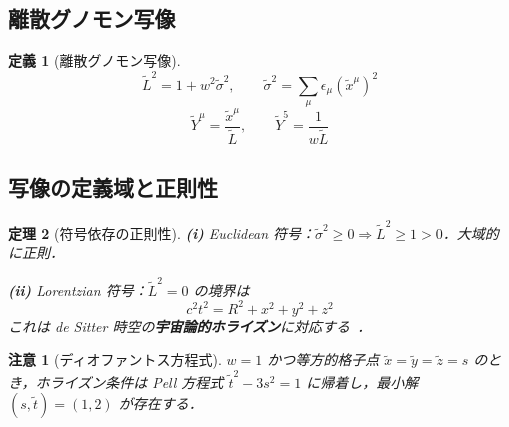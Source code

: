 \documentclass[12pt,a4paper]{ltjsarticle}
\newtheorem{theorem}{定理}[section]
\newtheorem{definition}[theorem]{定義}
\newtheorem*{remark}{注意}
\begin{document}
\subsection{離散グノモン写像}

\begin{definition}[離散グノモン写像]\label{def:discrete}
\begin{equation}
\tilde{L}^2 = 1 + w^2 \tilde{\sigma}^2, \qquad \tilde{\sigma}^2 = \sum_\mu \epsilon_\mu (\tilde{x}^\mu)^2 \tag{6.2}
\end{equation}
\begin{equation}
\tilde{Y}^\mu = \frac{\tilde{x}^\mu}{\tilde{L}}, \qquad \tilde{Y}^5 = \frac{1}{w\tilde{L}} \tag{6.3}
\end{equation}
\end{definition}

\subsection{写像の定義域と正則性}

\begin{theorem}[符号依存の正則性]\label{thm:reg}
\textbf{(i)} Euclidean 符号：$\tilde{\sigma}^2 \geq 0 \Rightarrow \tilde{L}^2 \geq 1 > 0$．大域的に正則．

\textbf{(ii)} Lorentzian 符号：$\tilde{L}^2 = 0$ の境界は
\begin{equation}
c^2t^2 = R^2 + x^2 + y^2 + z^2 \tag{6.6}
\end{equation}
これは de Sitter 時空の\textbf{宇宙論的ホライズン}に対応する~\cite{Guo2004}．
\end{theorem}

\begin{remark}[ディオファントス方程式]
$w = 1$ かつ等方的格子点 $\tilde{x} = \tilde{y} = \tilde{z} = s$ のとき，ホライズン条件は Pell 方程式 $\tilde{t}^2 - 3s^2 = 1$ に帰着し，最小解 $(s, \tilde{t}) = (1, 2)$ が存在する．
\end{remark}
\end{document}

